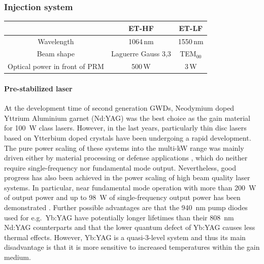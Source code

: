 \FloatBarrier
\subsubsection{Injection system}\label{sec:injection}

{\begin{table}[H]
\centering
\color{\contentcolor}
\begin{tabular}{c|c|c}
\hline
\hline
 & ET-HF &ET-LF\\
\hline
Wavelength &1064\,nm  & 1550\,nm\\
Beam shape & Laguerre Gauss 3,3   & TEM$_{00}$  \\
Optical power in front of  PRM & 500\,W& 3\,W\\
\hline
\hline
\end{tabular}
\end{table}
}

\FloatBarrier
\paragraph{Pre-stabilized laser}

At the development time of second generation GWDs, Neodymium doped Yttrium Aluminium garnet (Nd:YAG) was the best choice as the gain material for 100~W class lasers. However, in the last years, particularly thin disc lasers based on Ytterbium doped crystals have been undergoing a rapid development. The pure power scaling of these systems into the multi-kW range was mainly driven either by material processing or defense applications \cite{Deile2009,Kalisky2010}, which do neither require single-frequency nor fundamental mode output. Nevertheless, good progress has also been achieved in the power scaling of high beam quality laser systems. In particular, near fundamental mode operation with more than 200~W of output power and up to 98~W of single-frequency output power has been demonstrated \cite{Giesen2007}. Further possible advantages are that the 940~nm pump diodes used for e.g.\ Yb:YAG have potentially longer lifetimes than their 808~nm Nd:YAG counterparts and that the lower quantum defect of Yb:YAG causes less thermal effects. However, Yb:YAG is a quasi-3-level system and thus its main disadvantage is that it is more sensitive to increased temperatures within the gain medium.

